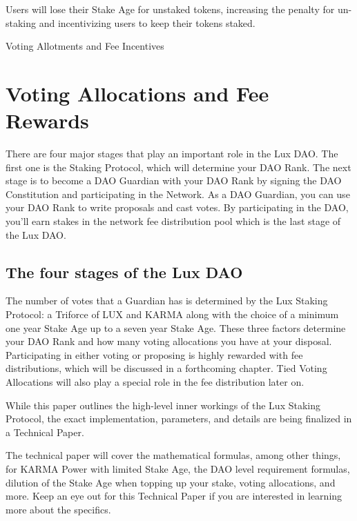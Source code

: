 \documentclass[11pt]{article}
\begin{document}
Users will lose their Stake Age for unstaked tokens, increasing the penalty for un-staking and incentivizing users to keep their tokens staked.


Voting Allotments and Fee Incentives


\section{Voting Allocations and Fee Rewards}

There are four major stages that play an important role in the Lux DAO. The first one is the Staking Protocol, which will determine your DAO Rank. The next stage is to become a DAO Guardian with your DAO Rank by signing the DAO Constitution and participating in the Network. As a DAO Guardian, you can use your DAO Rank to write proposals and cast votes. By participating in the DAO, you'll earn stakes in the network fee distribution pool which is the last stage of the Lux DAO.


\subsection{The four stages of the Lux DAO}

The number of votes that a Guardian has is determined by the Lux Staking Protocol: a Triforce of LUX and KARMA along with the choice of a minimum one year Stake Age up to a seven year Stake Age. These three factors determine your DAO Rank and how many voting allocations you have at your disposal. Participating in either voting or proposing is highly rewarded with fee distributions, which will be discussed in a forthcoming chapter. Tied Voting Allocations will also play a special role in the fee distribution later on.


While this paper outlines the high-level inner workings of the Lux Staking Protocol, the exact implementation, parameters, and details are being finalized in a Technical Paper.


The technical paper will cover the mathematical formulas, among other things, for KARMA Power with limited Stake Age, the DAO level requirement formulas, dilution of the Stake Age when topping up your stake, voting allocations, and more. Keep an eye out for this Technical Paper if you are interested in learning more about the specifics.
\end{document}
